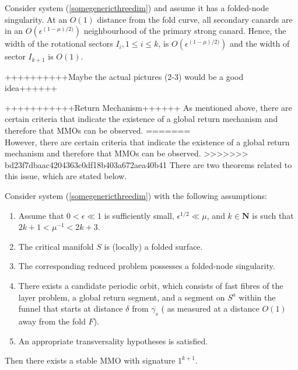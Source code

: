 \begin{theorem}
Consider system (\ref{somegenericthreedim}) and assume it has a folded-node singularity. At an $O(1)$ distance from the fold curve, all secondary canards are in an $O(\epsilon^{(1- \mu)/2)})$ neighbourhood of the primary strong canard. Hence, the width of the  rotational sectors $I_i, 1 \leq i \leq k$, is $O(\epsilon^{(1- \mu)/2)})$ and the width of sector $I_{k+1}$ is $O(1)$.
\end{theorem}

++++++++++Maybe the actual pictures (2-3) would be a good idea++++++ 

+++++++++++Return Mechanism++++++
As mentioned above, there are certain criteria that indicate the existence of a global return mechanism and therefore that MMOs can be observed.
=======
\\
However, there are certain criteria that indicate the existence of a global return mechanism and therefore that MMOs can be observed.
>>>>>>> bd23f7dbaac4204363c0df18b403a672aea40b41
There are two theorems related to this issue, which are stated below.

\begin{theorem} \label{MMOsigk1}
Consider system (\ref{somegenericthreedim}) with the following assumptions:
\begin{enumerate}
\item Assume that $ 0 < \epsilon \ll 1$ is sufficiently small, $\epsilon^{1/2} \ll \mu$, and $k \in \mathbf{N}$ is such that $2k + 1 < \mu^{-1} < 2k + 3$.
\item The critical manifold $S$ is (locally) a folded surface.
\item The corresponding reduced problem possesses a folded-node singularity.
\item There exists a candidate periodic orbit, which consists of fast fibres of the layer problem, a global return segment, and a segment on $S^a$ within the funnel that starts at distance $\delta$ from $\overline{\gamma_s}$ ( as measured at a distance $O(1)$ away from the fold $F$).
\item An appropriate transversality hypotheses is satisfied.
\end{enumerate}
Then there exists a stable MMO with signature $1^{k+1}$.
\end{theorem}

